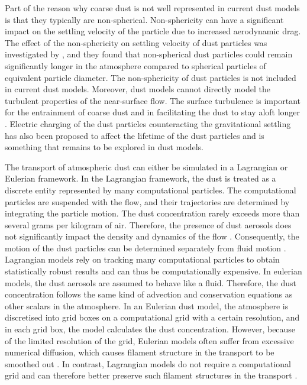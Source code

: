 Part of the reason why coarse dust is not well represented in current dust models is that they typically are non-spherical. Non-sphericity can have a significant impact on the settling velocity of the particle due to increased aerodynamic drag. The effect of the non-sphericity on settling velocity of dust particles was investigated by \textcite{mallios2020effects}, and they found that non-spherical dust particles could remain significantly longer in the atmosphere compared to spherical particles of equivalent particle diameter. The non-sphericity of dust particles is not included in current dust models. Moreover, dust models cannot directly model the turbulent properties of the near-surface flow. The surface turbulence is important for the entrainment of coarse dust \parencite{klose2013large} and in facilitating the dust to stay aloft longer \parencite{ryder2013impact}. Electric charging of the dust particles counteracting the gravitational settling has also been proposed to affect the lifetime of the dust particles and is something that remains to be explored in dust models.     

The transport of atmospheric dust can either be simulated in a Lagrangian or Eulerian framework. In the Lagrangian framework, the dust is treated as a discrete entity represented by many computational particles. The computational particles are suspended with the flow, and their trajectories are determined by integrating the particle motion. The dust concentration rarely exceeds more than several grams per kilogram of air. Therefore, the presence of dust aerosols does not significantly impact the density and dynamics of the flow \parencite{zhuang2001compositions}. Consequently, the motion of the dust particles can be determined separately from fluid motion \parencite{ShaoYaping2008PaMo}. Lagrangian models rely on tracking many computational particles to obtain statistically robust results and can thus be computationally expensive. In eulerian models, the dust aerosols are assumed to behave like a fluid. Therefore, the dust concentration follows the same kind of advection and conservation equations as other scalars in the atmosphere. In an Eulerian dust model, the atmosphere is discretised into grid boxes on a computational grid with a certain resolution, and in each grid box, the model calculates the dust concentration. However, because of the limited resolution of the grid, Eulerian models often suffer from excessive numerical diffusion, which causes filament structure in the transport to be smoothed out \parencite{cassiani_offline_2016}. In contrast, Lagrangian models do not require a computational grid and can therefore better preserve such filament structures in the transport \parencite{cassiani_offline_2016}.         

